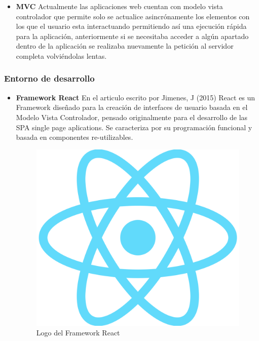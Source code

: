 \documentclass[12pt]{book}
\begin{document}
\begin{enumerate}
\begin{itemize}
    		\item \textbf{MVC}
    		Actualmente las aplicaciones web cuentan con modelo vista controlador que permite solo se actualice  asincrónamente los elementos con los que el usuario esta interactuando permitiendo así una ejecución rápida para la aplicación, anteriormente si se necesitaba acceder a algún apartado dentro de la aplicación se realizaba nuevamente la petición al servidor completa volviéndolas lentas. 
    	\end{itemize}
    
    	\subsubsection{Entorno de desarrollo}
    	\begin{itemize}
    		\item \textbf{Framework React}
    		En el articulo escrito por Jimenes, J (2015) React es un Framework diseñado para la creación de interfaces de usuario basada en el Modelo Vista Controlador, pensado originalmente para el desarrollo de las SPA single page aplications. Se caracteriza por su programación funcional y basada en componentes re-utilizables. 
    		
    		\begin{figure} [h]
    			\centering
    			\includegraphics[scale=0.05]{./src/mt1}
    			\caption{Logo del Framework React}
    			\label{fig:mt1}
    		\end{figure}
    	

\end{itemize}
\end{enumerate}
\end{document}
